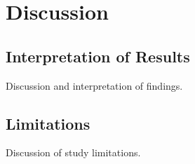 \chapter{Discussion}

\section{Interpretation of Results}

Discussion and interpretation of findings.

\section{Limitations}

Discussion of study limitations.
